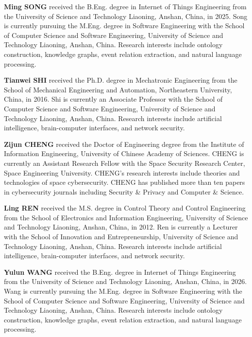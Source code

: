 \documentclass[Royal,sageh,times]{sagej}
\begin{document}
\par\medskip\noindent\begin{biogs}{}
\textbf{Ming SONG} 
received the B.Eng. degree in Internet of Things Engineering from the University of Science and Technology Liaoning, Anshan, China, in 2025. Song is currently pursuing the M.Eng. degree in Software Engineering with the School of Computer Science and Software Engineering, University of Science and Technology Liaoning, Anshan, China. Research interests include ontology construction, knowledge graphs, event relation extraction, and natural language processing.
\par

\par\medskip\noindent\textbf{Tianwei SHI} 
received the Ph.D. degree in Mechatronic Engineering from the School of Mechanical Engineering and Automation, Northeastern University, China, in 2016. Shi is currently an Associate Professor with the School of Computer Science and Software Engineering, University of Science and Technology Liaoning, Anshan, China. Research interests include artificial intelligence, brain-computer interfaces, and network security.
\par

\par\medskip\noindent\textbf{Zijun CHENG} 
received the Doctor of Engineering degree from the Institute of Information Engineering, University of Chinese Academy of Sciences. CHENG is currently an Assistant Research Fellow with the Space Security Research Center, Space Engineering University. CHENG's research interests include theories and technologies of space cybersecurity. CHENG has published more than ten papers in cybersecurity journals including Security \& Privacy and Computer \& Science.
\par

\par\medskip\noindent\textbf{Ling REN} 
received the M.S. degree in Control Theory and Control Engineering from the School of Electronics and Information Engineering, University of Science and Technology Liaoning, Anshan, China, in 2012. Ren is currently a Lecturer with the School of Innovation and Entrepreneurship, University of Science and Technology Liaoning, Anshan, China. Research interests include artificial intelligence, brain-computer interfaces, and network security.
\par

\par\medskip\noindent\textbf{Yulun WANG} 
received the B.Eng. degree in Internet of Things Engineering from the University of Science and Technology Liaoning, Anshan, China, in 2026. Wang is currently pursuing the M.Eng. degree in Software Engineering with the School of Computer Science and Software Engineering, University of Science and Technology Liaoning, Anshan, China. Research interests include ontology construction, knowledge graphs, event relation extraction, and natural language processing.
\par
\end{biogs}
\end{document}
